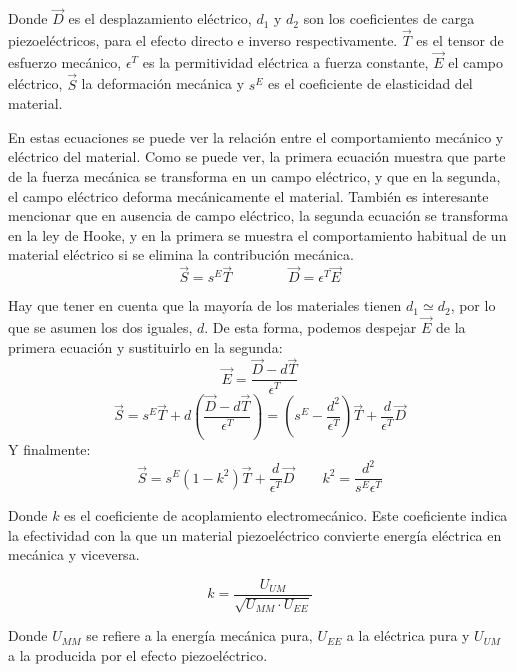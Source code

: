 \documentclass[12pt]{book}
\numberwithin{equation}{section}
\begin{document}
Donde $\vec{D}$ es el desplazamiento eléctrico, $d_1$ y $d_2$ son los coeficientes de carga piezoeléctricos, para el efecto directo e inverso respectivamente. $\vec{T}$ es el tensor de esfuerzo mecánico, $\epsilon ^T$ es la permitividad eléctrica a fuerza constante, $\vec{E}$ el campo eléctrico, $\vec{S}$ la deformación mecánica y $s^E$ es el coeficiente de elasticidad del material. 

En estas ecuaciones se puede ver la relación entre el comportamiento mecánico y eléctrico del material. Como se puede ver, la primera ecuación muestra que parte de la fuerza mecánica se transforma en un campo eléctrico, y que en la segunda, el campo eléctrico deforma mecánicamente el material. También es interesante mencionar que en ausencia de campo eléctrico, la segunda ecuación se transforma en la ley de Hooke, y en la primera se muestra el comportamiento habitual de un material eléctrico si se elimina la contribución mecánica.
\begin{equation}
\vec{S} = s^E \vec{T} \qquad \qquad \vec{D} = \epsilon ^T \vec{E}
\end{equation}

Hay que tener en cuenta que la mayoría de los materiales tienen $d_1 \simeq d_2$, por lo que se asumen los dos iguales, $d$. De esta forma, podemos despejar $\vec{E}$ de la primera ecuación y sustituirlo en la segunda:
\begin{equation}
\vec{E} = \frac{\vec{D}-d\vec{T}}{\epsilon^T}
\end{equation}
\begin{equation}
\vec{S} = s^E\vec{T} + d \left(\frac{\vec{D}-d\vec{T}}{\epsilon ^T} \right) = \left(s^E - \frac{d^2}{\epsilon ^T}\right)\vec{T} + \frac{d}{\epsilon ^T}\vec{D}
\end{equation}
Y finalmente:
\begin{equation}
\vec{S} = s^E (1 - k^2) \vec{T} + \frac{d}{\epsilon^T}\vec{D} \qquad k^2 = \frac{d^2}{s^E \epsilon ^T}
\end{equation}

Donde $k$ es el coeficiente de acoplamiento electromecánico. Este coeficiente indica la efectividad con la que un material piezoeléctrico convierte energía eléctrica en mecánica y viceversa.

\begin{equation}
k = \frac{U_{UM}}{\sqrt{U_{MM} \cdot U_{EE}}}
\end{equation}

Donde $U_{MM}$ se refiere a la energía mecánica pura, $U_{EE}$ a la eléctrica pura y $U_{UM}$ a la producida por el efecto piezoeléctrico.
\end{document}
